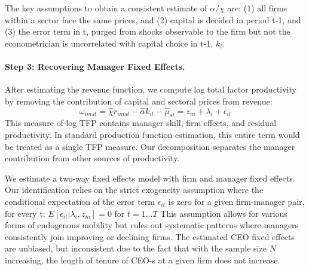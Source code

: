 \documentclass[11pt,a4paper]{article}
\begin{document}
The key assumptions to obtain a consistent estimate of $\alpha/\chi$ are: (1) all firms within a sector face the same prices, and (2) capital is decided in period t-1, and (3) the error term in t, purged from shocks observable to the firm but not the econometrician is uncorrelated with capital choice in t-1, $k_t$. 



\paragraph{Step 3: Recovering Manager Fixed Effects.} After estimating the revenue function, we compute log total factor productivity by removing the contribution of capital and sectoral prices from revenue:
\begin{equation}
\omega_{imst} = \hat{\chi} r_{imst} - \hat{\alpha} k_{it} - \hat{\mu}_{st} = z_m +  \lambda_i + \epsilon_{it}
\end{equation}
This measure of log TFP contains manager skill, firm effects, and residual productivity. In standard production function estimation, this entire term would be treated as a single TFP measure. Our decomposition separates the manager contribution from other sources of productivity.

We estimate a two-way fixed effects model with firm and manager fixed effects. Our identification relies on the strict exogeneity assumption where the conditional expectation of the error term $\epsilon_{it}$ is zero for a given firm-manager pair, for every t: $E[\epsilon_{it}|\lambda_i, z_m]=0$ for $t=1...T$ This assumption allows for various forms of endogenous mobility but rules out systematic patterns where managers consistently join improving or declining firms. The estimated CEO fixed effects are unbiased, but inconsistent due to the fact that with the sample size $N$ increasing, the length of tenure of CEO-s at a given firm does not increase.
\end{document}
